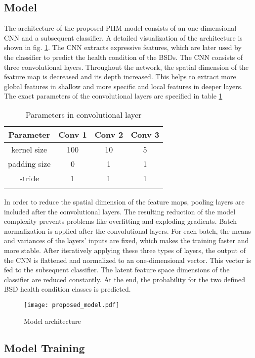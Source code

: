 \subsection{Model}
\label{sec:model}
The architecture of the proposed PHM model consists of an one-dimensional CNN and a subsequent classifier. A detailed visualization of the architecture is shown in fig. \ref{fig:proposed_model}. The CNN extracts expressive features, which are later used by the classifier to predict the health condition of the BSDs. The CNN consists of three convolutional layers. Throughout the network, the spatial dimension of the feature map is decreased and its depth increased. This helps to extract more global features in shallow and more specific and local features in deeper layers. The exact parameters of the convolutional layers are specified in table \ref{tab:parameter_conv} 
\begin{longtable}{c c c c} 
\toprule
Parameter & Conv 1 & Conv 2 & Conv 3 \\
\midrule
kernel size & 100 & 10 & 5 \\

padding size & 0 & 1 & 1 \\

stride & 1 & 1 & 1 \\
\bottomrule
\caption {Parameters in convolutional layer}
\label {tab:parameter_conv}
\end{longtable}

In order to reduce the spatial dimension of the feature maps, pooling layers are included after the convolutional layers. The resulting reduction of the model complexity prevents problems like overfitting and exploding gradients. Batch normalization is applied after the convolutional layers. For each batch, the means and variances of the layers' inputs are fixed, which makes the training faster and more stable. After iteratively applying these three types of layers, the output of the CNN is flattened and normalized to an one-dimensional vector. This vector is fed to the subsequent classifier. The latent feature space dimensions of the classifier are reduced constantly. At the end, the probability for the two defined BSD health condition classes is predicted.


\begin{figure}[H]
  \centering
  \texttt{[image: proposed\_model.pdf]}
  \caption {Model architecture} \label{fig:proposed_model}
\end{figure}


\subsection{Model Training} \label{sec:Proposed_training}

